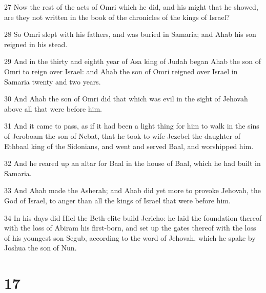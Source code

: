 \par 27 Now the rest of the acts of Omri which he did, and his might that he showed, are they not written in the book of the chronicles of the kings of Israel?
\par 28 So Omri slept with his fathers, and was buried in Samaria; and Ahab his son reigned in his stead.
\par 29 And in the thirty and eighth year of Asa king of Judah began Ahab the son of Omri to reign over Israel: and Ahab the son of Omri reigned over Israel in Samaria twenty and two years.
\par 30 And Ahab the son of Omri did that which was evil in the sight of Jehovah above all that were before him.
\par 31 And it came to pass, as if it had been a light thing for him to walk in the sins of Jeroboam the son of Nebat, that he took to wife Jezebel the daughter of Ethbaal king of the Sidonians, and went and served Baal, and worshipped him.
\par 32 And he reared up an altar for Baal in the house of Baal, which he had built in Samaria.
\par 33 And Ahab made the Asherah; and Ahab did yet more to provoke Jehovah, the God of Israel, to anger than all the kings of Israel that were before him.
\par 34 In his days did Hiel the Beth-elite build Jericho: he laid the foundation thereof with the loss of Abiram his first-born, and set up the gates thereof with the loss of his youngest son Segub, according to the word of Jehovah, which he spake by Joshua the son of Nun.

\chapter{17}

